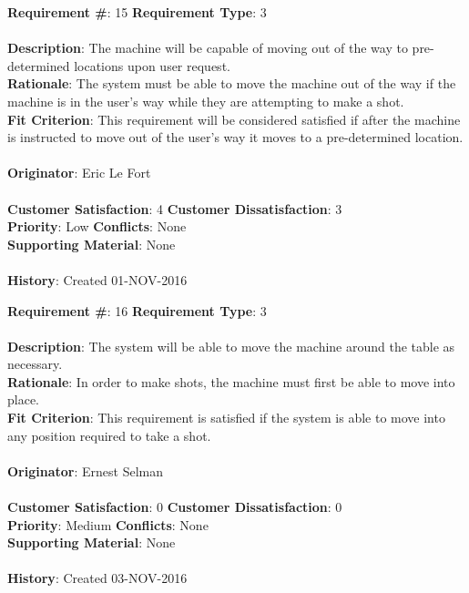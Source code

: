 \documentclass[titlepage]{article}
\begin{document}
\begin{framed}
	\noindent\textbf{Requirement \#}: 15 \hfill \textbf{Requirement Type}: 3 \hfill\\\\
	\noindent\textbf{Description}: The machine will be capable of moving out of the way to pre-determined locations upon user request.\\
	\textbf{Rationale}: The system must be able to move the machine out of the way if the machine is in the user's way while they are attempting to make a shot.\\
	\textbf{Fit Criterion}: This requirement will be considered satisfied if after the machine is instructed to move out of the user's way it moves to a pre-determined location.\\\\
	\textbf{Originator}: Eric Le Fort\\\\
	\noindent\textbf{Customer Satisfaction}: 4 \hfill 	\textbf{Customer Dissatisfaction}: 3 \hfill\\
	\textbf{Priority}: Low \hfill \textbf{Conflicts}: None \hfill\\
	\textbf{Supporting Material}: None\\\\
	\noindent\textbf{History}: Created 01-NOV-2016
\end{framed}

\begin{framed}
	\noindent\textbf{Requirement \#}: 16 \hfill \textbf{Requirement Type}: 3 \hfill\\\\
	\noindent\textbf{Description}: The system will be able to move the machine around the table as necessary. \\
	\textbf{Rationale}: In order to make shots, the machine must first be able to move into place.\\
	\textbf{Fit Criterion}: This requirement is satisfied if the system is able to move into any position required to take a shot.\\\\
	\textbf{Originator}: Ernest Selman\\\\
	\noindent\textbf{Customer Satisfaction}: 0 \hfill 	\textbf{Customer Dissatisfaction}: 0 \hfill\\
	\textbf{Priority}: Medium \hfill \textbf{Conflicts}: None \hfill\\
	\textbf{Supporting Material}: None\\\\
	\noindent\textbf{History}: Created 03-NOV-2016
\end{framed}
\end{document}
